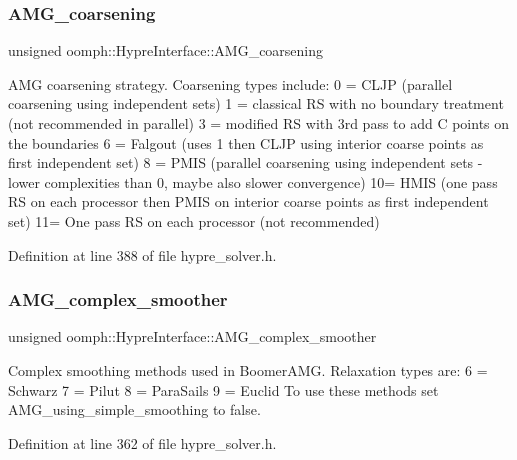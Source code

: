 \subsubsection{\texorpdfstring{A\+M\+G\+\_\+coarsening}{AMG\_coarsening}}
{\footnotesize\ttfamily unsigned oomph\+::\+Hypre\+Interface\+::\+A\+M\+G\+\_\+coarsening\hspace{0.3cm}{\ttfamily [protected]}}



A\+MG coarsening strategy. Coarsening types include\+: 0 = C\+L\+JP (parallel coarsening using independent sets) 1 = classical RS with no boundary treatment (not recommended in parallel) 3 = modified RS with 3rd pass to add C points on the boundaries 6 = Falgout (uses 1 then C\+L\+JP using interior coarse points as first independent set) 8 = P\+M\+IS (parallel coarsening using independent sets -\/ lower complexities than 0, maybe also slower convergence) 10= H\+M\+IS (one pass RS on each processor then P\+M\+IS on interior coarse points as first independent set) 11= One pass RS on each processor (not recommended) 



Definition at line 388 of file hypre\+\_\+solver.\+h.

\mbox{\label{classoomph_1_1HypreInterface_a7e4d8eeb1fb32cb7ada7c273edbf070e}} 
\subsubsection{\texorpdfstring{A\+M\+G\+\_\+complex\+\_\+smoother}{AMG\_complex\_smoother}}
{\footnotesize\ttfamily unsigned oomph\+::\+Hypre\+Interface\+::\+A\+M\+G\+\_\+complex\+\_\+smoother\hspace{0.3cm}{\ttfamily [protected]}}



Complex smoothing methods used in Boomer\+A\+MG. Relaxation types are\+: 6 = Schwarz 7 = Pilut 8 = Para\+Sails 9 = Euclid To use these methods set A\+M\+G\+\_\+using\+\_\+simple\+\_\+smoothing to false. 



Definition at line 362 of file hypre\+\_\+solver.\+h.

